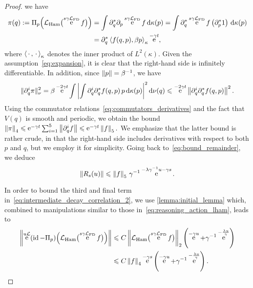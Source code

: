 \documentclass[11pt,a4paper]{article}
\DeclareMathOperator{\e}{e}
\DeclareMathOperator{\id}{id}
\newcommand{\dummy}{\,\cdot\,}
\newcommand{\expect}[0]{\mathbf{E}}
\renewcommand{\d}{\mathrm d}
\theoremstyle{plain}
\numberwithin{equation}{section}
\renewcommand{\leq}{\leqslant}
\begin{document}
\begin{proof}
    we have
    \begin{align*}
        \pi(q) := \Pi_p \Bigl( \mathcal L_{\rm Ham} \bigl(\e^{s \gamma \mathcal L_{\rm FD}} f\bigr) \Bigr)
        &= \int \partial_q^* \partial_p \e^{s \gamma \mathcal L_{\rm FD}} f \, \d \kappa(p)
        = \int \partial_q^* \e^{s \gamma \mathcal L_{\rm FD}} f \left(\partial_p^* 1 \right) \, \d \kappa(p) \\
        &= \partial_q^* \ip{f(q, p)}{\beta p}[\kappa] \e^{-\gamma t},
    \end{align*}
    where $\ip{\dummy}{\dummy}[\kappa]$ denotes the inner product of $L^2(\kappa)$.
    Given the assumption~\eqref{eq:expansion},
    it is clear that the right-hand side is infinitely differentiable.
    In addition, since $\norm{p} = \beta^{-1}$, we have
    \begin{align*}
        \norm*{\partial_q^i \pi}[\nu]^2
        = \beta \e^{-2 \gamma t} \int \left| \int \partial_q^i \partial_q^* f(q, p) \, p \, \d \kappa(p) \right|^2 \d \nu(q)
        \leq \e^{-2 \gamma t} \norm{\partial_q^i \partial_q^* f(q, p)}^2.
    \end{align*}
    Using the commutator relations~\eqref{eq:commutators_derivatives} and the fact that $V(q)$ is smooth and periodic,
    we obtain the bound
    \(
        \norm{\pi}[4] \leq \e^{-\gamma t} \sum_{i=1}^{5} \norm{\partial_q^i f} \leq \e^{-\gamma t} \norm{f}[5].
    \)
    We emphasize that the latter bound is rather crude,
    in that the right-hand side includes derivatives with respect to both $p$ and $q$,
    but we employ it for simplicity.
    Going back to~\eqref{eq:bound_remainder}, we deduce
    \[
        \norm{R_s(u)} \leq \norm{f}[5] \,\gamma^{-1} \e^{-\lambda \gamma^{-1} u - \gamma s}.
    \]

    In order to bound the third and final term in~\eqref{eq:intermediate_decay_correlation_2},
    we use \cref{lemma:initial_lemma} which,
    combined to manipulations similar to those in~\eqref{eq:reasoning_action_lham},
    leads to
    \begin{align*}
        \norm{\e^{u \mathcal L} (\id - \Pi_p) \Bigl( \mathcal L_{\rm Ham} \bigl(\e^{s \gamma \mathcal L_{\rm FD}} f\bigr) \Bigr)}
        &\leq C \norm{ \mathcal L_{\rm Ham} \bigl(\e^{s \gamma \mathcal L_{\rm FD}} f\bigr) }[2]  \left(\e^{-\gamma u} + \gamma^{-1} \e^{-\frac{\lambda u}{\gamma}} \right) \\
        &\leq C \norm{f}[4] \e^{-\gamma s}\left(\e^{-\gamma u} + \gamma^{-1} \e^{-\frac{\lambda u}{\gamma}} \right).
    \end{align*}


\end{proof}
\end{document}
